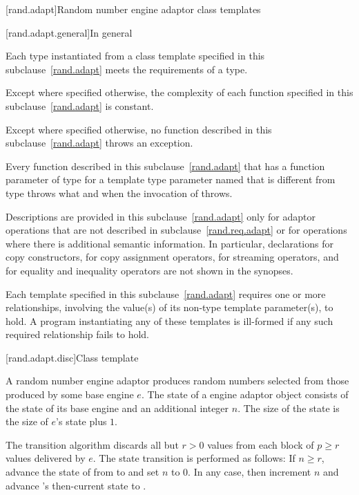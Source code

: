[rand.adapt]{Random number engine adaptor class templates}

[rand.adapt.general]{In general}

\pnum
Each type instantiated
from a class template specified in this subclause~\ref{rand.adapt}
meets the requirements
of a  type.

\pnum
Except where specified otherwise,
the complexity of each function
specified in this subclause~\ref{rand.adapt}
is constant.

\pnum
Except where specified otherwise,
no function described in this subclause~\ref{rand.adapt}
throws an exception.

\pnum
Every function described in this subclause~\ref{rand.adapt}
that has a function parameter  of type 
for a template type parameter named 
that is different from type 
throws what and when the invocation of  throws.

\pnum
Descriptions are provided in this subclause~\ref{rand.adapt}
only for adaptor operations
that are not described in subclause~\ref{rand.req.adapt}
or for operations where there is additional semantic information.
In particular,
declarations for copy constructors,
for copy assignment operators,
for streaming operators,
and for equality and inequality operators
are not shown in the synopses.

\pnum
Each template specified in this subclause~\ref{rand.adapt}
requires one or more relationships,
involving the value(s) of its non-type template parameter(s), to hold.
A program instantiating any of these templates
is ill-formed
if any such required relationship fails to hold.


[rand.adapt.disc]{Class template }%
%

\pnum
A  random number engine adaptor
produces random numbers
selected from those produced by some base engine $e$.
The state 
of a  engine adaptor object 
consists of the state  of its base engine 
and an additional integer $n$.
The size of the state is
 the size of $e$'s state plus $1$.

\pnum
The transition algorithm
discards all but $r > 0$ values
from each block of $p \geq r$ values delivered by $e$.
The state transition is performed as follows:
If $n \geq r$,
 advance the state of  from  to 
 and set $n$ to $0$.
In any case,
 then increment $n$
 and advance 's then-current state 
 to .

